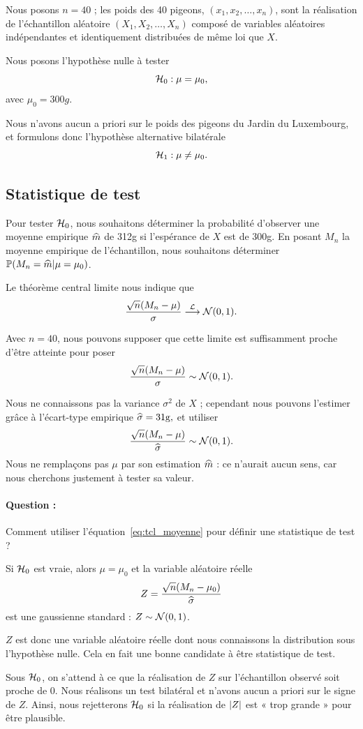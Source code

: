 \begin{answer}
	Nous posons $n=40$ ; les poids des 40 pigeons, $(x_1, x_2, \dots, x_n)$, sont
	la réalisation de l'échantillon aléatoire $(X_1, X_2, \dots, X_n)$ composé de
	variables aléatoires indépendantes et identiquement distribuées de même loi
	que $X$.
	
	Nous posons l'hypothèse nulle à tester
	\[
	\HH_0 : \mu = \mu_0,
	\]
	avec $\mu_0 = 300\si{g}.$
	
	Nous n'avons aucun a priori sur le poids des pigeons du Jardin du Luxembourg,
	et formulons donc l'hypothèse alternative bilatérale
	\[
	\HH_1 : \mu \neq \mu_0.
	\]
\end{answer}

\subsection{Statistique de test}
Pour tester $\HH_0$, nous souhaitons déterminer la probabilité d'observer une
moyenne empirique $\hatm$ de 312g si l'espérance de $X$ est de 300g.  En
posant $M_n$ la moyenne empirique de l'échantillon, nous souhaitons déterminer
$\PP(M_n=\hatm|\mu=\mu_0)$.

Le théorème central limite nous indique que 
\[
\frac{\sqrt{n} (M_n - \mu)}{\sigma}  \cvloi \Ncal(0, 1).
\]

Avec $n = 40$, nous pouvons supposer que cette limite est suffisamment proche
d'être atteinte pour poser
\[
\frac{\sqrt{n} (M_n - \mu)}{\sigma}  \sim \Ncal(0, 1).
\]

Nous ne connaissons pas la variance $\sigma^2$ de $X$ ; cependant nous pouvons
l'estimer grâce à l'écart-type empirique $\hatsigma = 31\si{g},$ et utiliser 
\begin{equation}
	\frac{\sqrt{n} (M_n - \mu)}{\hatsigma}  \sim \Ncal(0, 1).
	\label{eq:tcl_moyenne}
\end{equation}
Nous ne remplaçons pas $\mu$ par son estimation $\hatm$ : ce n'aurait aucun
sens, car nous cherchons justement à tester sa valeur.

\paragraph{Question :} Comment utiliser l'équation~\eqref{eq:tcl_moyenne} pour
définir une statistique de test ?
\bigskip

\begin{answer}
	Si $\HH_0$ est vraie, alors $\mu = \mu_0$ et la variable aléatoire réelle
	\begin{equation}
		\label{eq:z_moyennes}
		Z = \frac{\sqrt{n} (M_n - \mu_0)}{\hatsigma}
	\end{equation}
	est une gaussienne standard : $Z \sim \Ncal(0, 1)$.
	
	$Z$ est donc une variable aléatoire réelle dont nous connaissons la
	distribution sous l'hypothèse nulle. Cela en fait une bonne candidate à être
	statistique de test.
\end{answer}
Sous $\HH_0$, on s'attend à ce que la réalisation de $Z$ sur l'échantillon
observé soit proche de $0.$ Nous réalisons un test bilatéral et n'avons aucun a
priori sur le signe de $Z.$ Ainsi, nous rejetterons $\HH_0$ si la réalisation
de $\abs{Z}$ est « trop grande » pour être plausible.

